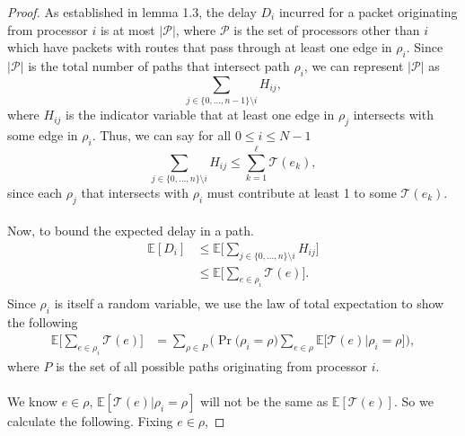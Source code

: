 \documentclass[psamsfonts, 10pt]{amsart}
\theoremstyle{definition}
\theoremstyle{remark}
\numberwithin{equation}{section}
\newcommand{\E}{\mathbb{E}}
\begin{document}
\begin{proof}
As established in lemma 1.3, the delay $D_i$ incurred for a packet originating from processor $i$ is at most $\lvert \mathcal{P} \rvert$, where $\mathcal{P}$ is the set of processors other than $i$ which have packets with routes that pass through at least one edge in $\rho_i$. Since $\lvert \mathcal{P} \rvert$ is the total number of paths that intersect path $\rho_i$, we can represent $\lvert \mathcal{P} \rvert$ as
\begin{equation}
\sum_{j \in \{0,...,n-1\}\setminus i} H_{ij},
\end{equation}
where $H_{ij}$ is the indicator variable that at least one edge in $\rho_j$ intersects with some edge in $\rho_i$. Thus, we can say for all $0 \leq i \leq N-1$
\begin{equation}
\sum_{j \in \{0,...,n\}\setminus i} H_{ij} \leq \sum_{k=1}^{\ell}\mathcal{T}(e_k),
\end{equation}
since each $\rho_j$ that intersects with $\rho_i$ must contribute at least 1 to some $\mathcal{T}(e_k)$.\\
\\
Now, to bound the expected delay in a path.
\begin{equation*}
\begin{aligned}
\E[D_i] &\leq \E\Big[\sum_{j \in \{0,...,n\}\setminus i} H_{ij}\Big]\\
&\leq \E\Big[\sum_{e \in \rho_i} \mathcal{T}(e)\Big].\\
\end{aligned}
\end{equation*}
Since $\rho_i$ is itself a random variable, we use the law of total expectation to show the following
\begin{equation}
\begin{aligned}
\E\Big[\sum_{e \in \rho_i} \mathcal{T}(e)\Big] &= \sum_{\rho \in P} \bigg(\Pr\Big(\rho_i = \rho\Big) \sum_{e \in \rho}\E\Big[ \mathcal{T}(e) \lvert \rho_i = \rho\Big]\bigg),
\end{aligned}
\end{equation}
where $P$ is the set of all possible paths originating from processor $i$.\\
\\
We know $e \in \rho$, $\E[\mathcal{T}(e) \lvert \rho_i = \rho]$ will not be the same as $\E[\mathcal{T}(e)]$. So we calculate the following. Fixing $e \in \rho$,


\end{proof}
\end{document}
